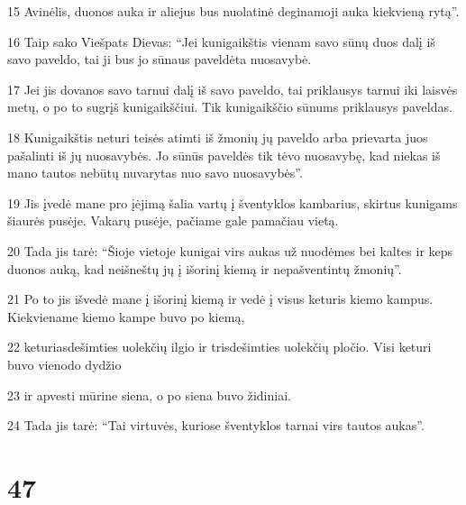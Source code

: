 \par 15 Avinėlis, duonos auka ir aliejus bus nuolatinė deginamoji auka kiekvieną rytą”. 
\par 16 Taip sako Viešpats Dievas: “Jei kunigaikštis vienam savo sūnų duos dalį iš savo paveldo, tai ji bus jo sūnaus paveldėta nuosavybė. 
\par 17 Jei jis dovanos savo tarnui dalį iš savo paveldo, tai priklausys tarnui iki laisvės metų, o po to sugrįš kunigaikščiui. Tik kunigaikščio sūnums priklausys paveldas. 
\par 18 Kunigaikštis neturi teisės atimti iš žmonių jų paveldo arba prievarta juos pašalinti iš jų nuosavybės. Jo sūnūs paveldės tik tėvo nuosavybę, kad niekas iš mano tautos nebūtų nuvarytas nuo savo nuosavybės”. 
\par 19 Jis įvedė mane pro įėjimą šalia vartų į šventyklos kambarius, skirtus kunigams šiaurės pusėje. Vakarų pusėje, pačiame gale pamačiau vietą. 
\par 20 Tada jis tarė: “Šioje vietoje kunigai virs aukas už nuodėmes bei kaltes ir keps duonos auką, kad neišneštų jų į išorinį kiemą ir nepašventintų žmonių”. 
\par 21 Po to jis išvedė mane į išorinį kiemą ir vedė į visus keturis kiemo kampus. Kiekviename kiemo kampe buvo po kiemą, 
\par 22 keturiasdešimties uolekčių ilgio ir trisdešimties uolekčių pločio. Visi keturi buvo vienodo dydžio 
\par 23 ir apvesti mūrine siena, o po siena buvo židiniai. 
\par 24 Tada jis tarė: “Tai virtuvės, kuriose šventyklos tarnai virs tautos aukas”.



\chapter{47}


